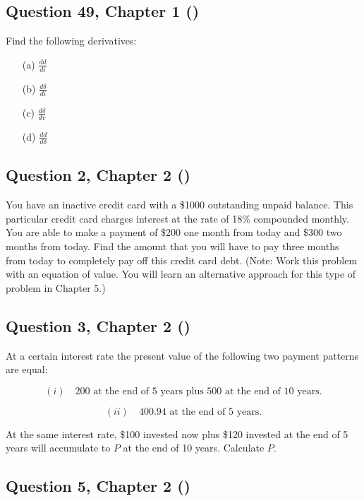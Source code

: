 \documentclass[12pt, a4paper]{article}
\begin{document}
\subsection*{Question 49, Chapter 1  (\cite{toi3rd})}
\noindent Find the following derivatives:
\begin{enumerate}
    \item[(a)] \( \frac{dd}{di} \)
    \item[(b)] \( \frac{d\delta}{di} \)
    \item[(c)] \( \frac{d\delta}{dv} \)
    \item[(d)] \( \frac{dd}{d\delta} \)
\end{enumerate}


\subsection*{Question 2, Chapter 2 (\cite{toi3rd})}

\noindent You have an inactive credit card with a \$1000 outstanding unpaid balance. This particular credit card charges interest at the rate of 18\% compounded monthly. You are able to make a payment of \$200 one month from today and \$300 two months from today. Find the amount that you will have to pay three months from today to completely pay off this credit card debt. (Note: Work this problem with an equation of value. You will learn an alternative approach for this type of problem in Chapter 5.)

\bigskip


\subsection*{Question 3, Chapter 2 (\cite{toi3rd})}

\noindent At a certain interest rate the present value of the following two payment patterns are equal:

\[
(i) \quad 200 \text{ at the end of 5 years plus } 500 \text{ at the end of 10 years.}
\]

\[
(ii) \quad 400.94 \text{ at the end of 5 years.}
\]

At the same interest rate, \$100 invested now plus \$120 invested at the end of 5 years will accumulate to \( P \) at the end of 10 years. Calculate \( P \).

\bigskip


\subsection*{Question 5, Chapter 2 (\cite{toi3rd})}
\end{document}
